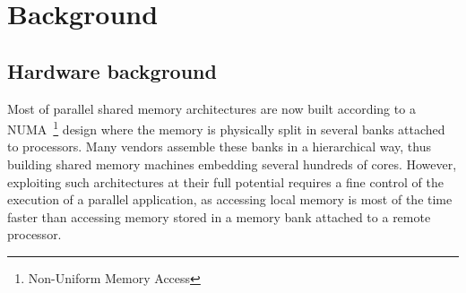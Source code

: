 \documentclass{Styles/llncs}
\newcommand{\benchs}{KASTORS }
\begin{document}



\section{Background}
\subsection{Hardware background}
Most of parallel shared memory architectures are now built according to a NUMA~\footnote{Non-Uniform Memory Access} design where the memory is physically split in several banks attached to processors.
Many vendors assemble these banks in a hierarchical way, thus building shared memory machines embedding several hundreds of cores.
However, exploiting such architectures at their full potential requires a fine control of the execution of a parallel application, as accessing local memory is most of the time faster than accessing memory stored in a memory bank attached to a remote processor.
\end{document}
